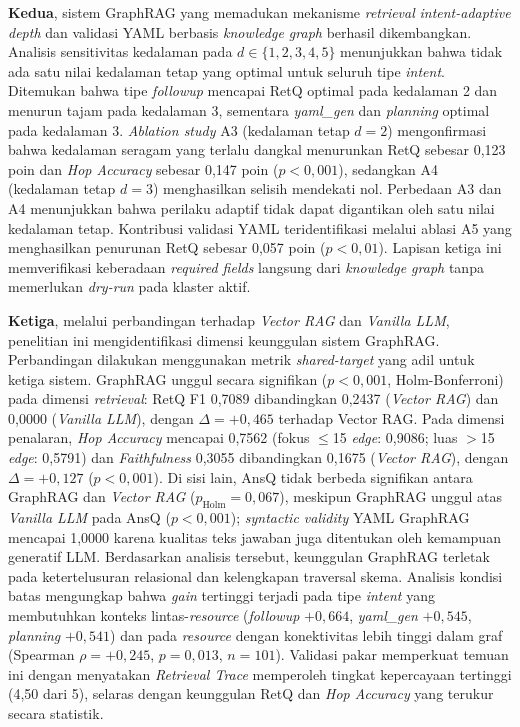 \textbf{Kedua}, sistem GraphRAG yang memadukan mekanisme \textit{retrieval} \textit{intent-adaptive depth} dan validasi YAML berbasis \textit{knowledge graph} berhasil dikembangkan. Analisis sensitivitas kedalaman pada $d \in \{1, 2, 3, 4, 5\}$ menunjukkan bahwa tidak ada satu nilai kedalaman tetap yang optimal untuk seluruh tipe \textit{intent}. Ditemukan bahwa tipe \textit{followup} mencapai RetQ optimal pada kedalaman 2 dan menurun tajam pada kedalaman 3, sementara \textit{yaml\_gen} dan \textit{planning} optimal pada kedalaman 3. \textit{Ablation study} A3 (kedalaman tetap $d=2$) mengonfirmasi bahwa kedalaman seragam yang terlalu dangkal menurunkan RetQ sebesar 0,123 poin dan \textit{Hop Accuracy} sebesar 0,147 poin ($p < 0{,}001$), sedangkan A4 (kedalaman tetap $d=3$) menghasilkan selisih mendekati nol. Perbedaan A3 dan A4 menunjukkan bahwa perilaku adaptif tidak dapat digantikan oleh satu nilai kedalaman tetap. Kontribusi validasi YAML teridentifikasi melalui ablasi A5 yang menghasilkan penurunan RetQ sebesar 0,057 poin ($p < 0{,}01$). Lapisan ketiga ini memverifikasi keberadaan \textit{required fields} langsung dari \textit{knowledge graph} tanpa memerlukan \textit{dry-run} pada klaster aktif.

\textbf{Ketiga}, melalui perbandingan terhadap \textit{Vector RAG} dan \textit{Vanilla LLM}, penelitian ini mengidentifikasi dimensi keunggulan sistem GraphRAG. Perbandingan dilakukan menggunakan metrik \textit{shared-target} yang adil untuk ketiga sistem. GraphRAG unggul secara signifikan ($p < 0{,}001$, Holm-Bonferroni) pada dimensi \textit{retrieval}: RetQ F1 0,7089 dibandingkan 0,2437 (\textit{Vector RAG}) dan 0,0000 (\textit{Vanilla LLM}), dengan $\Delta{=}{+}0{,}465$ terhadap Vector RAG. Pada dimensi penalaran, \textit{Hop Accuracy} mencapai 0,7562 (fokus $\leq$15 \textit{edge}: 0,9086; luas $>$15 \textit{edge}: 0,5791) dan \textit{Faithfulness} 0,3055 dibandingkan 0,1675 (\textit{Vector RAG}), dengan $\Delta{=}{+}0{,}127$ ($p{<}0{,}001$). Di sisi lain, AnsQ tidak berbeda signifikan antara GraphRAG dan \textit{Vector RAG} ($p_{\text{Holm}}{=}0{,}067$), meskipun GraphRAG unggul atas \textit{Vanilla LLM} pada AnsQ ($p{<}0{,}001$); \textit{syntactic validity} YAML GraphRAG mencapai 1,0000 karena kualitas teks jawaban juga ditentukan oleh kemampuan generatif LLM. Berdasarkan analisis tersebut, keunggulan GraphRAG terletak pada ketertelusuran relasional dan kelengkapan traversal skema. Analisis kondisi batas mengungkap bahwa \textit{gain} tertinggi terjadi pada tipe \textit{intent} yang membutuhkan konteks lintas-\textit{resource} (\textit{followup} $+0{,}664$, \textit{yaml\_gen} $+0{,}545$, \textit{planning} $+0{,}541$) dan pada \textit{resource} dengan konektivitas lebih tinggi dalam graf (Spearman $\rho{=}{+}0{,}245$, $p{=}0{,}013$, $n{=}101$). Validasi pakar memperkuat temuan ini dengan menyatakan \textit{Retrieval Trace} memperoleh tingkat kepercayaan tertinggi (4,50 dari 5), selaras dengan keunggulan RetQ dan \textit{Hop Accuracy} yang terukur secara statistik.

